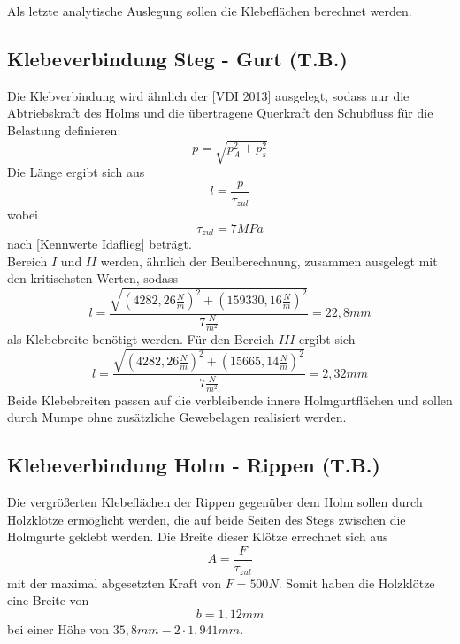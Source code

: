 Als letzte analytische Auslegung sollen die Klebeflächen berechnet werden.
\subsection{Klebeverbindung Steg - Gurt (T.B.)}
Die Klebverbindung wird ähnlich der [VDI 2013]  ausgelegt, sodass nur die Abtriebskraft des Holms und die übertragene Querkraft den Schubfluss für die Belastung definieren:
\begin{equation}
	p=\sqrt{p_{A}^{2}+p_{s}^{2}}
\end{equation}
Die Länge ergibt sich aus 
\begin{equation}
	l=\frac{p}{\tau_{zul}}
\end{equation}
wobei 
\begin{equation}
	\tau_{zul}=7MPa
\end{equation}
nach [Kennwerte Idaflieg] beträgt.\\

\noindent Bereich $I$ und $II$ werden, ähnlich der Beulberechnung, zusammen ausgelegt mit den kritischsten Werten, sodass 
\begin{equation}
	l=\frac{\sqrt{(4282,26\frac{N}{m})^{2}+(159330,16\frac{N}{m})^{2}}}{7\frac{N}{m^{2}}}=22,8mm
\end{equation}
als Klebebreite benötigt werden. Für den Bereich $III$ ergibt sich
\begin{equation}
	l=\frac{\sqrt{(4282,26\frac{N}{m})^{2}+(15665,14\frac{N}{m})^{2}}}{7\frac{N}{m^{2}}}=2,32mm
\end{equation}
Beide Klebebreiten passen auf die verbleibende innere Holmgurtflächen und sollen durch Mumpe ohne zusätzliche Gewebelagen realisiert werden.

\subsection{Klebeverbindung Holm - Rippen (T.B.)}
Die vergrößerten Klebeflächen der Rippen gegenüber dem Holm sollen durch Holzklötze ermöglicht werden, die auf beide Seiten des Stegs zwischen die Holmgurte geklebt werden. Die Breite dieser Klötze errechnet sich aus 
\begin{equation}
	A=\frac{F}{\tau_{zul}}
\end{equation}
mit der maximal abgesetzten Kraft von $F=500N$.
Somit haben die Holzklötze eine Breite von 
\begin{equation}
	b=1,12mm
\end{equation}
bei einer Höhe von $35,8mm-2\cdot 1,941mm$.